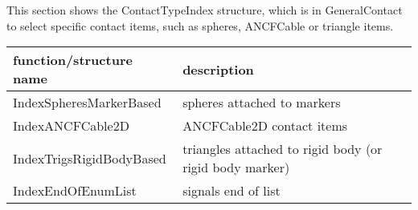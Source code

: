 \label{sec:ContactTypeIndex}
This section shows the ContactTypeIndex structure, which is in GeneralContact to select specific contact items, such as spheres, ANCFCable or triangle items.



\begin{center}
\footnotesize
\begin{longtable}{| p{8cm} | p{8cm} |} 
\hline
{\bf function/structure name} & {\bf description}\\ \hline
  IndexSpheresMarkerBased & spheres attached to markers\\ \hline 
  IndexANCFCable2D & ANCFCable2D contact items\\ \hline 
  IndexTrigsRigidBodyBased & triangles attached to rigid body (or rigid body marker)\\ \hline 
  IndexEndOfEnumList & signals end of list\\ \hline 
\end{longtable}
\end{center}
